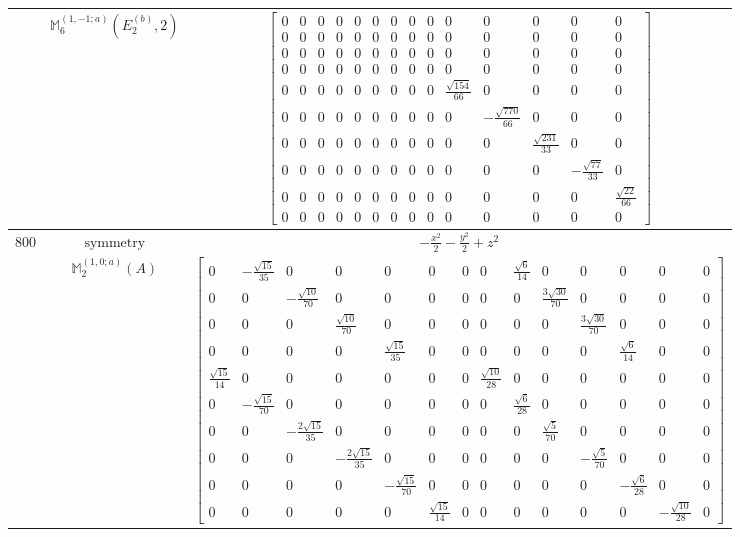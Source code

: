 \documentclass[fleqn,8pt,landscape]{jsarticle}
\begin{document}
\begin{longtable}{ccc}
$  $ & $ \mathbb{M}_{6}^{(1,-1;a)}(E_{2}^{(b)},2) $ & $ \begin{bmatrix} 0 & 0 & 0 & 0 & 0 & 0 & 0 & 0 & 0 & 0 & 0 & 0 & 0 & 0 \\ 0 & 0 & 0 & 0 & 0 & 0 & 0 & 0 & 0 & 0 & 0 & 0 & 0 & 0 \\ 0 & 0 & 0 & 0 & 0 & 0 & 0 & 0 & 0 & 0 & 0 & 0 & 0 & 0 \\ 0 & 0 & 0 & 0 & 0 & 0 & 0 & 0 & 0 & 0 & 0 & 0 & 0 & 0 \\ 0 & 0 & 0 & 0 & 0 & 0 & 0 & 0 & 0 & \frac{\sqrt{154}}{66} & 0 & 0 & 0 & 0 \\ 0 & 0 & 0 & 0 & 0 & 0 & 0 & 0 & 0 & 0 & - \frac{\sqrt{770}}{66} & 0 & 0 & 0 \\ 0 & 0 & 0 & 0 & 0 & 0 & 0 & 0 & 0 & 0 & 0 & \frac{\sqrt{231}}{33} & 0 & 0 \\ 0 & 0 & 0 & 0 & 0 & 0 & 0 & 0 & 0 & 0 & 0 & 0 & - \frac{\sqrt{77}}{33} & 0 \\ 0 & 0 & 0 & 0 & 0 & 0 & 0 & 0 & 0 & 0 & 0 & 0 & 0 & \frac{\sqrt{22}}{66} \\ 0 & 0 & 0 & 0 & 0 & 0 & 0 & 0 & 0 & 0 & 0 & 0 & 0 & 0 \end{bmatrix} $ \\ \hline
$ 800 $ & $ \text{symmetry} $ & $ - \frac{x^{2}}{2} - \frac{y^{2}}{2} + z^{2} $ \\
$  $ & $ \mathbb{M}_{2}^{(1,0;a)}(A) $ & $ \begin{bmatrix} 0 & - \frac{\sqrt{15}}{35} & 0 & 0 & 0 & 0 & 0 & 0 & \frac{\sqrt{6}}{14} & 0 & 0 & 0 & 0 & 0 \\ 0 & 0 & - \frac{\sqrt{10}}{70} & 0 & 0 & 0 & 0 & 0 & 0 & \frac{3 \sqrt{30}}{70} & 0 & 0 & 0 & 0 \\ 0 & 0 & 0 & \frac{\sqrt{10}}{70} & 0 & 0 & 0 & 0 & 0 & 0 & \frac{3 \sqrt{30}}{70} & 0 & 0 & 0 \\ 0 & 0 & 0 & 0 & \frac{\sqrt{15}}{35} & 0 & 0 & 0 & 0 & 0 & 0 & \frac{\sqrt{6}}{14} & 0 & 0 \\ \frac{\sqrt{15}}{14} & 0 & 0 & 0 & 0 & 0 & 0 & \frac{\sqrt{10}}{28} & 0 & 0 & 0 & 0 & 0 & 0 \\ 0 & - \frac{\sqrt{15}}{70} & 0 & 0 & 0 & 0 & 0 & 0 & \frac{\sqrt{6}}{28} & 0 & 0 & 0 & 0 & 0 \\ 0 & 0 & - \frac{2 \sqrt{15}}{35} & 0 & 0 & 0 & 0 & 0 & 0 & \frac{\sqrt{5}}{70} & 0 & 0 & 0 & 0 \\ 0 & 0 & 0 & - \frac{2 \sqrt{15}}{35} & 0 & 0 & 0 & 0 & 0 & 0 & - \frac{\sqrt{5}}{70} & 0 & 0 & 0 \\ 0 & 0 & 0 & 0 & - \frac{\sqrt{15}}{70} & 0 & 0 & 0 & 0 & 0 & 0 & - \frac{\sqrt{6}}{28} & 0 & 0 \\ 0 & 0 & 0 & 0 & 0 & \frac{\sqrt{15}}{14} & 0 & 0 & 0 & 0 & 0 & 0 & - \frac{\sqrt{10}}{28} & 0 \end{bmatrix} $ \\ \hline

\end{longtable}
\end{document}
